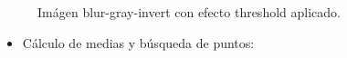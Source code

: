 \begin{figure}[H]
	\vspace{-0.2cm}
	\centering
	\centering
	\caption{Im\'agen blur-gray-invert con efecto threshold aplicado.}
	\label{fig:font-thresh}
	\vspace{-0.15cm}
\end{figure}

\newpage
\begin{itemize}
	\item C\'alculo de medias y b\'usqueda de puntos:
\end{itemize}

